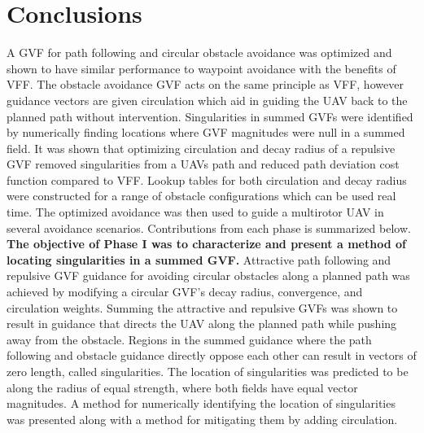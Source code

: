 \documentclass[numbered,pdftex]{ohio-etd}
\begin{document}
\chapter{Conclusions}

A GVF for path following and circular obstacle avoidance was optimized and shown to have similar performance to waypoint avoidance with the benefits of VFF. The obstacle avoidance GVF acts on the same principle as VFF, however guidance vectors are given circulation which aid in guiding the UAV back to the planned path without intervention. Singularities in summed GVFs were identified by numerically finding locations where GVF magnitudes were null in a summed field. It was shown that optimizing circulation and decay radius of a repulsive GVF removed singularities from a UAVs path and reduced path deviation cost function compared to VFF. Lookup tables for both circulation and decay radius were constructed for a range of obstacle configurations which can be used real time. The optimized avoidance was then used to guide a multirotor UAV in several avoidance scenarios. Contributions from each phase is summarized below. \\

\textbf{The objective of Phase I was to characterize and present a method of locating singularities in a summed GVF.}
Attractive path following and repulsive GVF guidance for avoiding circular obstacles along a planned path was achieved by modifying a circular GVF's decay radius, convergence, and circulation weights. Summing the attractive and repulsive GVFs was shown to result in guidance that directs the UAV along the planned path while pushing away from the obstacle. Regions in the summed guidance where the path following and obstacle guidance directly oppose each other can result in vectors of zero length, called singularities. The location of singularities was predicted to be along the radius of equal strength, where both fields have equal vector magnitudes. A method for numerically identifying the location of singularities was presented along with a method for mitigating them by adding circulation. 
\end{document}
